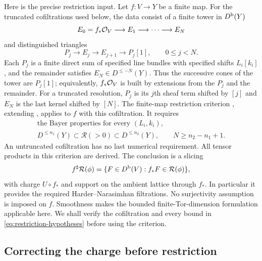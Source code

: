 Here is the precise restriction input.  Let $f:V\to Y$ be a finite map.
For the truncated cofiltrations used below, the data consist of a finite
tower in $D^{\mathrm b}(Y)$
\[
 E_0=f_*\mathcal O_V\longrightarrow E_1\longrightarrow\cdots
      \longrightarrow E_N
\]
and distinguished triangles
\[
 P_j\longrightarrow E_j\longrightarrow E_{j+1}
      \longrightarrow P_j[1],\qquad 0\le j<N.
\]
Each $P_j$ is a finite direct sum of specified line bundles with specified
shifts $L_i[k_i]$, and the remainder satisfies $E_N\in D^{\le-N}(Y)$.
Thus the successive cones of the tower are $P_j[1]$; equivalently,
$f_*\mathcal O_V$ is built by extensions from the $P_j$ and the remainder.
For a truncated resolution, $P_j$ is its $j$th sheaf term shifted by $[j]$
and $E_N$ is the last kernel shifted by $[N]$.
The finite-map restriction
criterion \cite[Proposition~3.24]{LiEtAl2026}, extending
\cite[Corollary~2.2.2]{Polishchuk2007}, applies to $f$ with this
cofiltration.  It requires
\begin{equation}\label{eq:restriction-hypotheses}
 \begin{gathered}
 \text{the Bayer properties for every }(L_i,k_i),\\
 D^{\le n_1}(Y)\subset\mathcal R(>0)\subset D^{\le n_2}(Y),
 \qquad N\ge n_2-n_1+1.
 \end{gathered}
\end{equation}
An untruncated cofiltration has no last numerical requirement.  All tensor
products in this criterion are derived.  The conclusion is a slicing
\begin{equation}\label{eq:induced-slicing}
 f^\sharp\mathcal R(\phi)=
       \{F\in D^{\mathrm b}(V):f_*F\in\mathcal R(\phi)\},
\end{equation}
with charge $U\circ f_*$ and support on the ambient lattice through $f_*$.
In particular it provides the required Harder--Narasimhan filtrations.
No surjectivity assumption is imposed on $f$.  Smoothness makes the bounded
finite-Tor-dimension formulation applicable here.  We shall verify the
cofiltration and every bound in \eqref{eq:restriction-hypotheses} before
using the criterion.

\subsection{Correcting the charge before restriction}

